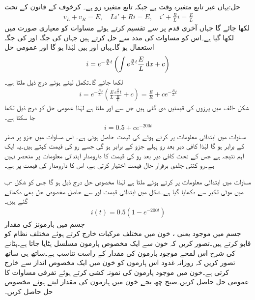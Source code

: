 حل:یہاں غیر تابع متغیرہ وقت  ہے جبکہ تابع متغیرہ رو  ہے۔ کرخوف کے قانون کے تحت 
\begin{align*}
v_L+v_R=E, \quad L i'+Ri=E, \quad i'+\frac{R}{L}i=\frac{E}{L}
\end{align*}
لکھا جائے گا جہاں آخری قدم پر  سے تقسیم کرتے ہوئے مساوات کو معیاری صورت میں لکھا گیا ہے۔اس کو مساوات  کی مدد سے حل کرتے ہیں جہاں  کی جگہ  اور  کی جگہ  استعمال ہو گا۔یہاں  اور  ہیں لہٰذا  ہو گا اور عمومی حل
\begin{align*}
i=e^{-\frac{R}{L}t}\left(\int e^{\frac{R}{L}t}  \frac{E}{L} \dif x+c\right)
\end{align*}
لکھا جائے گا۔تکمل لیتے ہوئے درج ذیل ملتا ہے۔
\begin{align}\label{مساوات_سادہ_اول_برقی_مزاحمت_امالہ_سلسلہ_وار}
i=e^{-\frac{R}{L}t}\left(\frac{E}{L} \frac{e^{\frac{R}{L}}t}{\frac{R}{L}}+c\right)=\frac{E}{R}+ce^{-\frac{R}{L}t}
\end{align}
شکل -الف میں پرزوں کی قیمتیں دی گئی ہیں جن سے  اور
  ملتا ہے لہٰذا عمومی حل کو درج ذیل لکھا جا سکتا ہے۔
\begin{align}
i=0.5+ce^{-200t}
\end{align} 
مساوات  میں ابتدائی معلومات پر کرتے ہوئے  کی قیمت حاصل ہوتی ہے۔ اس مساوات میں  جزو  پر صفر کے برابر ہو گا لہٰذا کافی دیر بعد رو پہلے جزو  کے برابر ہو گی جسے رو کی  قیمت کہتے ہیں۔یہ ایک اہم نتیجہ ہے جس کے  تحت کافی دیر بعد رو کی قیمت کا دارومدار ابتدائی معلومات پر منحصر نہیں ہے۔رو کتنی جلدی برقرار حال قیمت اختیار کرتی ہے، اس کا دارومدار  کی قیمت پر ہے۔

مساوات  میں ابتدائی معلومات  پر کرتے   ہوئے  ملتا ہے لہٰذا مخصوص حل درج ذیل ہو گا جس کو شکل -ب میں موٹی لکیر سے دکھایا گیا ہے۔شکل میں ابتدائی قیمت  اور  سے حاصل مخصوص حل بھی دکھائے گئے ہیں۔
\begin{align}
i(t)=0.5(1-e^{-200t})
\end{align}
\quad جسم میں ہارمونز کی مقدار\\
جسم میں موجود  یعنی  ، خون میں مختلف مرکبات خارج کرتے ہوئے مختلف نظام کو قابو کرتے ہیں۔تصور کریں کہ خون سے ایک مخصوص ہارمون مسلسل ہٹایا جاتا ہے۔ہٹانے کی شرح اس لمحے موجود ہارمون کی مقدار کے راست تناسب ہے۔ساتھ ہی ساتھ تصور کریں کہ روزانہ غدود اس ہارمون کو خون میں ایک مخصوص انداز سے خارج کرتی ہے۔خون میں موجود ہارمون کی نمونہ کشی کرتے ہوئے تفرقی مساوات کا عمومی حل حاصل کریں۔صبح چھ بجے خون میں ہارمون کی مقدار  لیتے ہوئے مخصوص حل حاصل کریں۔  

